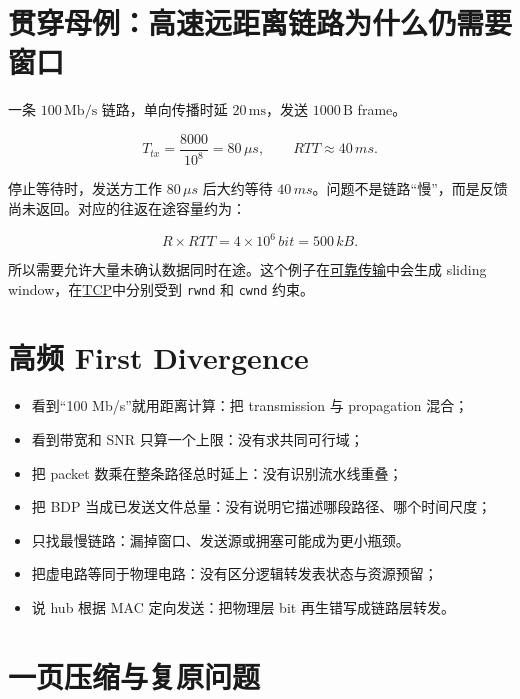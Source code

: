 \documentclass[UTF8,fontset=none,11pt,a4paper]{ctexart}
\providecommand{\tightlist}{\setlength{\itemsep}{0pt}\setlength{\parskip}{0pt}}
\providecommand{\passthrough}[1]{#1}
\begin{document}
\section{贯穿母例：高速远距离链路为什么仍需要窗口}\label{10-ux8d2fux7a7fux6bcdux4f8bux9ad8ux901fux8fdcux8dddux79bbux94feux8defux4e3aux4ec0ux4e48ux4ecdux9700ux8981ux7a97ux53e3}

一条 \(100\,\mathrm{Mb/s}\) 链路，单向传播时延 \(20\,\mathrm{ms}\)，发送
\(1000\,\mathrm{B}\) frame。

\[
T_{tx}=\frac{8000}{10^8}=80\,\mu s,
\qquad
RTT\approx40\,ms.
\]

停止等待时，发送方工作 \(80\,\mu s\) 后大约等待
\(40\,ms\)。问题不是链路``慢''，而是反馈尚未返回。对应的往返在途容量约为：

\[
R\times RTT=4\times10^6\,bit=500\,kB.
\]

所以需要允许大量未确认数据同时在途。这个例子在\href{../03_可靠传输_序号_ACK_定时器与滑动窗口/README.md}{可靠传输}中会生成
sliding
window，在\href{../06_传输层_端点_UDP与TCP状态机/README.md}{TCP}中分别受到
\passthrough{\lstinline!rwnd!} 和 \passthrough{\lstinline!cwnd!} 约束。

\section{高频 First
Divergence}\label{11-ux9ad8ux9891-first-divergence}

\begin{itemize}
\tightlist
\item
  看到``100 Mb/s''就用距离计算：把 transmission 与 propagation 混合；
\item
  看到带宽和 SNR 只算一个上限：没有求共同可行域；
\item
  把 packet 数乘在整条路径总时延上：没有识别流水线重叠；
\item
  把 BDP 当成已发送文件总量：没有说明它描述哪段路径、哪个时间尺度；
\item
  只找最慢链路：漏掉窗口、发送源或拥塞可能成为更小瓶颈。
\item
  把虚电路等同于物理电路：没有区分逻辑转发表状态与资源预留；
\item
  说 hub 根据 MAC 定向发送：把物理层 bit 再生错写成链路层转发。
\end{itemize}

\section{一页压缩与复原问题}\label{12-ux4e00ux9875ux538bux7f29ux4e0eux590dux539fux95eeux9898}
\end{document}
